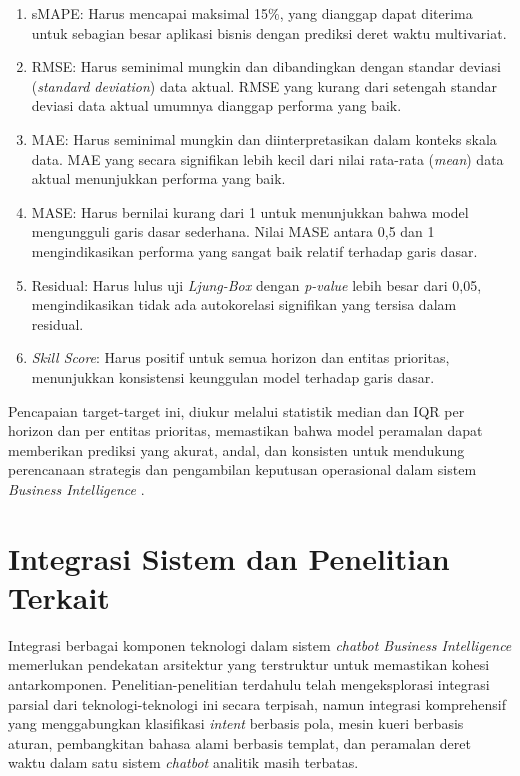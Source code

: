 \begin{enumerate}[label=\alph*.]
    \item sMAPE: Harus mencapai maksimal 15\%, yang dianggap dapat diterima untuk sebagian besar aplikasi bisnis dengan prediksi deret waktu multivariat.
    
    \item RMSE: Harus seminimal mungkin dan dibandingkan dengan standar deviasi (\textit{standard deviation}) data aktual. RMSE yang kurang dari setengah standar deviasi data aktual umumnya dianggap performa yang baik.
    
    \item MAE: Harus seminimal mungkin dan diinterpretasikan dalam konteks skala data. MAE yang secara signifikan lebih kecil dari nilai rata-rata (\textit{mean}) data aktual menunjukkan performa yang baik.
    
    \item MASE: Harus bernilai kurang dari 1 untuk menunjukkan bahwa model mengungguli garis dasar sederhana. Nilai MASE antara 0,5 dan 1 mengindikasikan performa yang sangat baik relatif terhadap garis dasar.
    
    \item Residual: Harus lulus uji \textit{Ljung-Box} dengan \textit{p-value} lebih besar dari 0,05, mengindikasikan tidak ada autokorelasi signifikan yang tersisa dalam residual.
    
    \item \textit{Skill Score}: Harus positif untuk semua horizon dan entitas prioritas, menunjukkan konsistensi keunggulan model terhadap garis dasar.
\end{enumerate}

Pencapaian target-target ini, diukur melalui statistik median dan IQR per horizon dan per entitas prioritas, memastikan bahwa model peramalan dapat memberikan prediksi yang akurat, andal, dan konsisten untuk mendukung perencanaan strategis dan pengambilan keputusan operasional dalam sistem \textit{Business Intelligence} \autocite{Petropoulos2023ForecastEval}.

\section{Integrasi Sistem dan Penelitian Terkait}

Integrasi berbagai komponen teknologi dalam sistem \textit{chatbot Business Intelligence} memerlukan pendekatan arsitektur yang terstruktur untuk memastikan kohesi antarkomponen. Penelitian-penelitian terdahulu telah mengeksplorasi integrasi parsial dari teknologi-teknologi ini secara terpisah, namun integrasi komprehensif yang menggabungkan klasifikasi \textit{intent} berbasis pola, mesin kueri berbasis aturan, pembangkitan bahasa alami berbasis templat, dan peramalan deret waktu dalam satu sistem \textit{chatbot} analitik masih terbatas.

